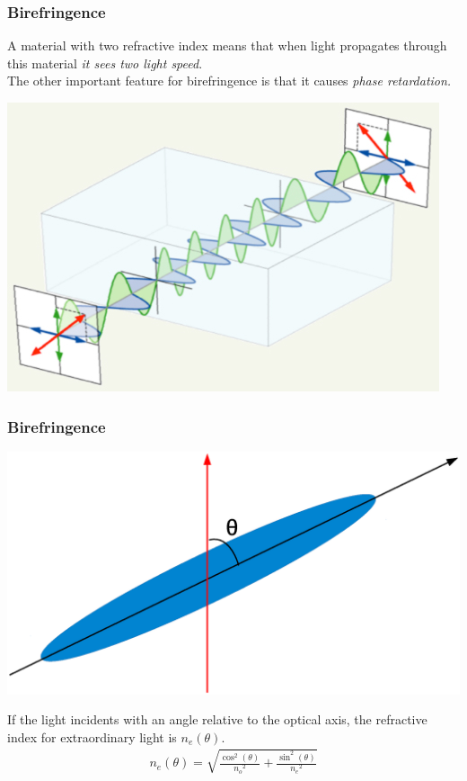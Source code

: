 \documentclass{beamer}
\begin{document}
\begin{frame}
\frametitle{Birefringence}
A material with two refractive index means that when light propagates through this material \emph{it sees two light speed}. \\
The other important feature for birefringence is that it causes \em{phase retardation}.
\begin{center}
\includegraphics[scale=0.4]{phase_retardation.jpg}
\end{center}
\end{frame}
\begin{frame}
\frametitle{Birefringence}
\begin{center}
\includegraphics[scale=0.3]{n_eff.eps}
\end{center}
If the light incidents with an angle relative to the optical axis, the refractive index for extraordinary light is $n_e(\theta)$.
\begin{eqnarray}
n_e(\theta) = \sqrt{\frac{\cos^2(\theta)}{{n_o}^2}+\frac{\sin^2(\theta)}{{n_e}^2}}
\end{eqnarray}
\end{frame}
\end{document}
